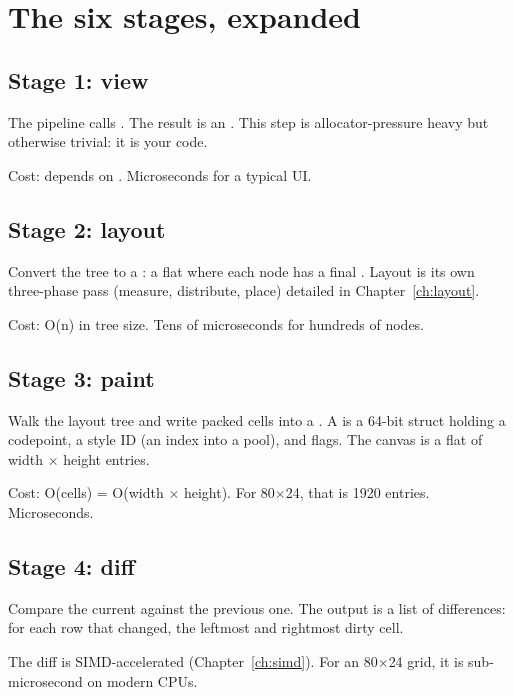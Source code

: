 \section{The six stages, expanded}

\subsection*{Stage 1: view}

The pipeline calls . The result is an
. This step is allocator-pressure heavy but
otherwise trivial: it is your code.

Cost: depends on . Microseconds for a typical UI.

\subsection*{Stage 2: layout}

Convert the  tree to a : a flat
 where each node has a final
. Layout is its own three-phase pass (measure,
distribute, place) detailed in Chapter~\ref{ch:layout}.

Cost: O(n) in tree size. Tens of microseconds for hundreds of
nodes.

\subsection*{Stage 3: paint}

Walk the layout tree and write packed cells into a .
A  is a 64-bit struct holding a codepoint, a
style ID (an index into a pool), and flags. The canvas is a flat
 of width $\times$ height entries.

Cost: O(cells) = O(width $\times$ height). For 80$\times$24,
that is 1920 entries. Microseconds.

\subsection*{Stage 4: diff}

Compare the current  against the previous one. The
output is a list of  differences: for each row that
changed, the leftmost and rightmost dirty cell.

The diff is SIMD-accelerated (Chapter~\ref{ch:simd}). For an
80$\times$24 grid, it is sub-microsecond on modern CPUs.

